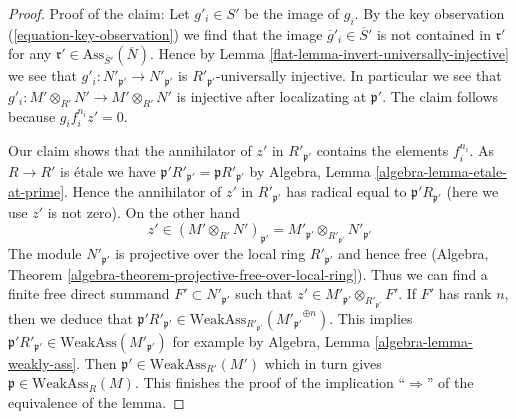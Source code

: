 \begin{proof}
\medskip\noindent
Proof of the claim: Let $g'_i \in S'$ be the image of $g_i$.
By the key observation (\ref{equation-key-observation})
we find that the image $\overline{g}'_i \in \overline{S}'$
is not contained in $\mathfrak r'$ for any
$\mathfrak r' \in \text{Ass}_{\overline{S}'}(\overline{N})$.
Hence by Lemma \ref{flat-lemma-invert-universally-injective}
we see that $g'_i : N'_{\mathfrak p'} \to N'_{\mathfrak p'}$ is
$R'_{\mathfrak p'}$-universally injective. In particular
we see that $g'_i : M' \otimes_{R'} N' \to M' \otimes_{R'} N'$ is
injective after localizating at $\mathfrak p'$. The claim
follows because $g_i f_i^{n_i} z' = 0$.

\medskip\noindent
Our claim shows that the annihilator of $z'$ in $R'_{\mathfrak p'}$
contains the elements $f_i^{n_i}$. As $R \to R'$ is \'etale we have
$\mathfrak p'R'_{\mathfrak p'} = \mathfrak pR'_{\mathfrak p'}$
by Algebra, Lemma \ref{algebra-lemma-etale-at-prime}.
Hence the annihilator of $z'$ in $R'_{\mathfrak p'}$ has radical equal to
$\mathfrak p' R_{\mathfrak p'}$ (here we use $z'$ is not zero).
On the other hand
$$
z' \in (M' \otimes_{R'} N')_{\mathfrak p'} =
M'_{\mathfrak p'} \otimes_{R'_{\mathfrak p'}} N'_{\mathfrak p'}
$$
The module $N'_{\mathfrak p'}$ is projective over the local ring
$R'_{\mathfrak p'}$ and hence free
(Algebra, Theorem \ref{algebra-theorem-projective-free-over-local-ring}).
Thus we can find a finite free direct summand $F' \subset N'_{\mathfrak p'}$
such that $z' \in M'_{\mathfrak p'} \otimes_{R'_{\mathfrak p'}} F'$.
If $F'$ has rank $n$, then we deduce that
$\mathfrak p' R'_{\mathfrak p'} \in
\text{WeakAss}_{R'_{\mathfrak p'}}({M'_{\mathfrak p'}}^{\oplus n})$.
This implies
$\mathfrak p'R'_{\mathfrak p'} \in \text{WeakAss}(M'_{\mathfrak p'})$
for example by Algebra, Lemma \ref{algebra-lemma-weakly-ass}.
Then $\mathfrak p' \in \text{WeakAss}_{R'}(M')$
which in turn gives $\mathfrak p \in \text{WeakAss}_R(M)$.
This finishes the proof of the implication
``$\Rightarrow$'' of the equivalence of the lemma.


\end{proof}
